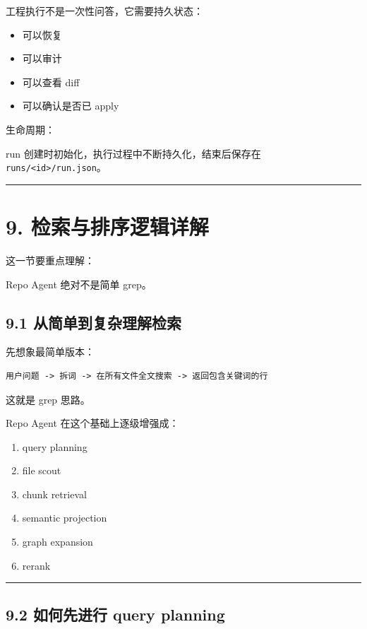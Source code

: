 \documentclass[UTF8,12pt,openany]{ctexbook}
\begin{document}
工程执行不是一次性问答，它需要持久状态：\par

\begin{itemize}
\item 可以恢复
\item 可以审计
\item 可以查看 diff
\item 可以确认是否已 apply
\end{itemize}

生命周期：\par

run 创建时初始化，执行过程中不断持久化，结束后保存在 \texttt{runs/<id>/run.json}。\par

\hrule

\section{9. 检索与排序逻辑详解}

这一节要重点理解：  \par
Repo Agent 绝对不是简单 grep。\par

\subsection{9.1 从简单到复杂理解检索}

先想象最简单版本：\par

\begin{lstlisting}
用户问题 -> 拆词 -> 在所有文件全文搜索 -> 返回包含关键词的行
\end{lstlisting}

这就是 grep 思路。\par

Repo Agent 在这个基础上逐级增强成：\par

\begin{enumerate}
\item query planning
\item file scout
\item chunk retrieval
\item semantic projection
\item graph expansion
\item rerank
\end{enumerate}

\hrule

\subsection{9.2 如何先进行 query planning}
\end{document}
